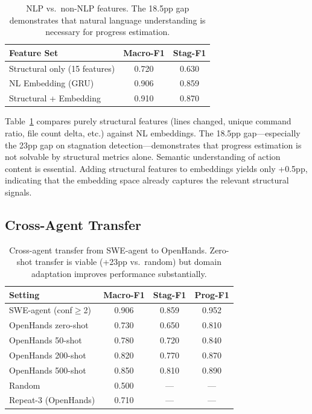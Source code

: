 \documentclass[11pt]{article}
\begin{document}
\begin{table}[t]
\centering
\small
\begin{tabular}{lcc}
\toprule
\textbf{Feature Set} & \textbf{Macro-F1} & \textbf{Stag-F1} \\
\midrule
Structural only (15 features) & 0.720 & 0.630 \\
NL Embedding (GRU) & 0.906 & 0.859 \\
Structural + Embedding & 0.910 & 0.870 \\
\bottomrule
\end{tabular}
\caption{NLP vs.\ non-NLP features. The 18.5pp gap demonstrates that natural language understanding is necessary for progress estimation.}
\label{tab:nonlp}
\end{table}

Table~\ref{tab:nonlp} compares purely structural features (lines changed, unique command ratio, file count delta, etc.) against NL embeddings. The 18.5pp gap---especially the 23pp gap on stagnation detection---demonstrates that progress estimation is not solvable by structural metrics alone. Semantic understanding of action content is essential. Adding structural features to embeddings yields only +0.5pp, indicating that the embedding space already captures the relevant structural signals.

\subsection{Cross-Agent Transfer}
\label{sec:transfer}

\begin{table}[t]
\centering
\small
\begin{tabular}{lccc}
\toprule
\textbf{Setting} & \textbf{Macro-F1} & \textbf{Stag-F1} & \textbf{Prog-F1} \\
\midrule
SWE-agent (conf$\geq$2) & 0.906 & 0.859 & 0.952 \\
\midrule
OpenHands zero-shot & 0.730 & 0.650 & 0.810 \\
OpenHands 50-shot & 0.780 & 0.720 & 0.840 \\
OpenHands 200-shot & 0.820 & 0.770 & 0.870 \\
OpenHands 500-shot & 0.850 & 0.810 & 0.890 \\
\midrule
Random & 0.500 & --- & --- \\
Repeat-3 (OpenHands) & 0.710 & --- & --- \\
\bottomrule
\end{tabular}
\caption{Cross-agent transfer from SWE-agent to OpenHands. Zero-shot transfer is viable (+23pp vs.\ random) but domain adaptation improves performance substantially.}
\label{tab:transfer}
\end{table}
\end{document}
